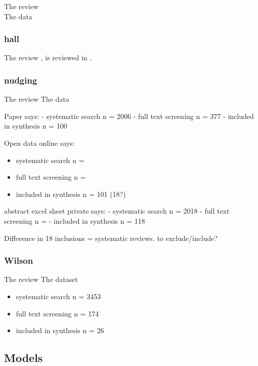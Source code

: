 \documentclass[
]{book}
\providecommand{\tightlist}{%
  \setlength{\itemsep}{0pt}\setlength{\parskip}{0pt}}
\begin{document}
The review\\
The data

\hypertarget{hall}{%
\subsubsection{hall}\label{hall}}

The review \citep{Hall2012}, is reviewed in \citep{Yu2016}.

\hypertarget{nudging}{%
\subsubsection{nudging}\label{nudging}}

The review \citep{Nagtegaal2019}
The data \citep{Nagtegaal2019a}

Paper says:
- systematic search n = 2006
- full text screening n = 377
- included in synthesis n = 100

Open data online says:

\begin{itemize}
\tightlist
\item
  systematic search n =
\item
  full text screening n =
\item
  included in synthesis n = 101 (18?)
\end{itemize}

abstract excel sheet private says:
- systematic search n = 2018
- full text screening n =
- included in synthesis n = 118

Difference in 18 inclusions = systematic reviews. to exclude/include?

\hypertarget{wilson}{%
\subsubsection{Wilson}\label{wilson}}

The review \citep{Appenzeller-Herzog2019}
The dataset \citep{Appenzeller-Herzog2020}

\begin{itemize}
\tightlist
\item
  systematic search n = 3453
\item
  full text screening n = 174
\item
  included in synthesis n = 26
\end{itemize}

\hypertarget{models-1}{%
\subsection{Models}\label{models-1}}
\end{document}
